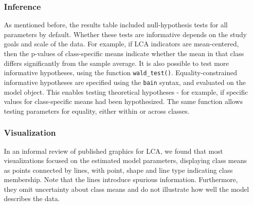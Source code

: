 \documentclass[
  ,man,floatsintext]{apa6}
\begin{document}
\hypertarget{inference}{%
\subsubsection{Inference}\label{inference}}

As mentioned before, the results table included null-hypothesis tests for all parameters by default.
Whether these tests are informative depends on the study goals and scale of the data.
For example, if LCA indicators are mean-centered,
then the p-values of class-specific means indicate whether the mean in that class differs significantly from the sample average.
It is also possible to test more informative hypotheses,
using the function \texttt{wald\_test()}.
Equality-constrained informative hypotheses are specified using the \texttt{bain} syntax,
and evaluated on the model object.
This enables testing theoretical hypotheses - for example, if specific values for class-specific means had been hypothesized.
The same function allows testing parameters for equality, either within or across classes.

\hypertarget{visualization}{%
\subsubsection{Visualization}\label{visualization}}

In an informal review of published graphics for LCA,
we found that most visualizations focused on the estimated model parameters,
displaying class means as points connected by lines, with point, shape and line type indicating class membership.
Note that the lines introduce spurious information.
Furthermore, they omit uncertainty about class means and do not illustrate how well the model describes the data.
\end{document}
